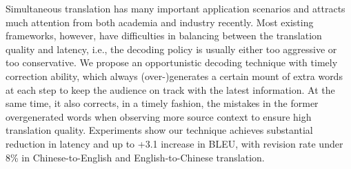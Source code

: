 Simultaneous translation has many important application scenarios and attracts much attention from both academia and industry recently. Most existing frameworks, however, have difficulties in balancing between the translation quality and latency, i.e., the decoding policy is usually either too aggressive or too conservative. We propose an opportunistic decoding technique with timely correction ability, which always (over-)generates a certain mount of extra words at each step to keep the audience on track with the latest information. At the same time, it also corrects, in a timely fashion, the mistakes in the former overgenerated words when observing more source context to ensure high translation quality. Experiments show our technique achieves substantial reduction in latency and up to +3.1 increase in BLEU, with revision rate under 8\% in Chinese-to-English and English-to-Chinese translation.
